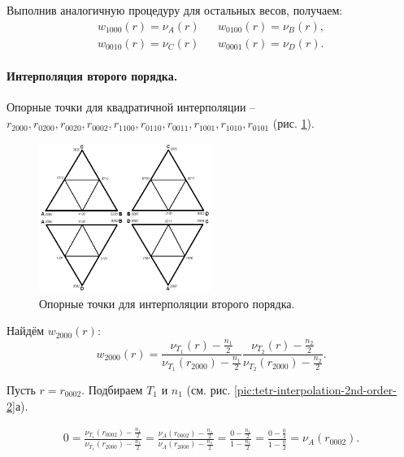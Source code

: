 Выполнив аналогичную процедуру для остальных весов, получаем:
\begin{align}
w_{1000}(r) = \nu_{A}(r) & & w_{0100}(r) = \nu_{B}(r), \nonumber\\
w_{0010}(r) = \nu_{C}(r) & & w_{0001}(r) = \nu_{D}(r).
\end{align}


\paragraph{Интерполяция второго порядка.} Опорные точки для квадратичной интерполяции -- $r_{2000}, r_{0200}, r_{0020}, r_{0002}, r_{1100}, r_{0110}, r_{0011}, r_{1001}, r_{1010}, r_{0101}$ (рис. \ref{pic:tetr-interpolation-2nd-order-1}).

\begin{figure}[h]
\centering
\includegraphics[width=0.5\textwidth]{png/tetr-interp-2nd-order-1.png}
\caption{Опорные точки для интерполяции второго порядка.}
\label{pic:tetr-interpolation-2nd-order-1}
\end{figure}


Найдём $w_{2000}(r)$:
\begin{equation}
w_{2000}(r) = \frac{ \nu_{T_1}(r) - \frac{n_1}{2} }{ \nu_{T_1}(r_{2000}) - \frac{n_1}{2} } \frac{ \nu_{T_2}(r) - \frac{n_2}{2} }{ \nu_{T_2}(r_{2000}) - \frac{n_2}{2} }.
\end{equation}


Пусть $r = r_{0002}$. Подбираем $T_1$ и $n_1$ (см. рис. \ref{pic:tetr-interpolation-2nd-order-2}а).

\begin{align}
0 = \frac{ \nu_{T_1}(r_{0002}) - \frac{n_1}{2} }{ \nu_{T_1}(r_{2000}) - \frac{n_1}{2} } = \frac{ \nu_{A}(r_{0002}) - \frac{n_1}{2} }{ \nu_{A}(r_{2000}) - \frac{n_1}{2} } = \frac{ 0 - \frac{n_1}{2} }{ 1 - \frac{n_1}{2} } = \frac{ 0 - \frac{0}{2} }{ 1 - \frac{0}{2} } = \nu_{A}(r_{0002}).
\end{align}

